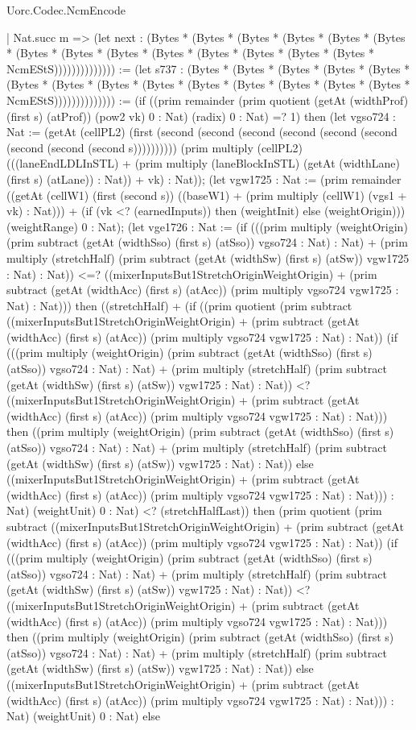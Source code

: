 \begin{lexlean}{Uorc.Codec.NcmEncode}
\begin{semanticmodule}
{    | Nat.succ m => (let next : (Bytes * (Bytes * (Bytes * (Bytes * (Bytes * (Bytes * (Bytes * (Bytes * (Bytes * (Bytes * (Bytes * (Bytes * (Bytes * (Bytes * NcmEStS)))))))))))))) := (let s737 : (Bytes * (Bytes * (Bytes * (Bytes * (Bytes * (Bytes * (Bytes * (Bytes * (Bytes * (Bytes * (Bytes * (Bytes * (Bytes * (Bytes * NcmEStS)))))))))))))) := (if ((prim remainder (prim quotient (getAt (widthProf) (first s) (atProf)) (pow2 vk) 0 : Nat) (radix) 0 : Nat) =? 1) then (let vgso724 : Nat := (getAt (cellPL2) (first (second (second (second (second (second (second (second (second (second s)))))))))) (prim multiply (cellPL2) (((laneEndLDLInSTL) + (prim multiply (laneBlockInSTL) (getAt (widthLane) (first s) (atLane)) : Nat)) + vk) : Nat)); (let vgw1725 : Nat := (prim remainder ((getAt (cellW1) (first (second s)) ((baseW1) + (prim multiply (cellW1) (vgs1 + vk) : Nat))) + (if (vk <? (earnedInputs)) then (weightInit) else (weightOrigin))) (weightRange) 0 : Nat); (let vge1726 : Nat := (if (((prim multiply (weightOrigin) (prim subtract (getAt (widthSso) (first s) (atSso)) vgso724 : Nat) : Nat) + (prim multiply (stretchHalf) (prim subtract (getAt (widthSw) (first s) (atSw)) vgw1725 : Nat) : Nat)) <=? ((mixerInputsBut1StretchOriginWeightOrigin) + (prim subtract (getAt (widthAcc) (first s) (atAcc)) (prim multiply vgso724 vgw1725 : Nat) : Nat))) then ((stretchHalf) + (if ((prim quotient (prim subtract ((mixerInputsBut1StretchOriginWeightOrigin) + (prim subtract (getAt (widthAcc) (first s) (atAcc)) (prim multiply vgso724 vgw1725 : Nat) : Nat)) (if (((prim multiply (weightOrigin) (prim subtract (getAt (widthSso) (first s) (atSso)) vgso724 : Nat) : Nat) + (prim multiply (stretchHalf) (prim subtract (getAt (widthSw) (first s) (atSw)) vgw1725 : Nat) : Nat)) <? ((mixerInputsBut1StretchOriginWeightOrigin) + (prim subtract (getAt (widthAcc) (first s) (atAcc)) (prim multiply vgso724 vgw1725 : Nat) : Nat))) then ((prim multiply (weightOrigin) (prim subtract (getAt (widthSso) (first s) (atSso)) vgso724 : Nat) : Nat) + (prim multiply (stretchHalf) (prim subtract (getAt (widthSw) (first s) (atSw)) vgw1725 : Nat) : Nat)) else ((mixerInputsBut1StretchOriginWeightOrigin) + (prim subtract (getAt (widthAcc) (first s) (atAcc)) (prim multiply vgso724 vgw1725 : Nat) : Nat))) : Nat) (weightUnit) 0 : Nat) <? (stretchHalfLast)) then (prim quotient (prim subtract ((mixerInputsBut1StretchOriginWeightOrigin) + (prim subtract (getAt (widthAcc) (first s) (atAcc)) (prim multiply vgso724 vgw1725 : Nat) : Nat)) (if (((prim multiply (weightOrigin) (prim subtract (getAt (widthSso) (first s) (atSso)) vgso724 : Nat) : Nat) + (prim multiply (stretchHalf) (prim subtract (getAt (widthSw) (first s) (atSw)) vgw1725 : Nat) : Nat)) <? ((mixerInputsBut1StretchOriginWeightOrigin) + (prim subtract (getAt (widthAcc) (first s) (atAcc)) (prim multiply vgso724 vgw1725 : Nat) : Nat))) then ((prim multiply (weightOrigin) (prim subtract (getAt (widthSso) (first s) (atSso)) vgso724 : Nat) : Nat) + (prim multiply (stretchHalf) (prim subtract (getAt (widthSw) (first s) (atSw)) vgw1725 : Nat) : Nat)) else ((mixerInputsBut1StretchOriginWeightOrigin) + (prim subtract (getAt (widthAcc) (first s) (atAcc)) (prim multiply vgso724 vgw1725 : Nat) : Nat))) : Nat) (weightUnit) 0 : Nat) else }
\end{semanticmodule}
\end{lexlean}
